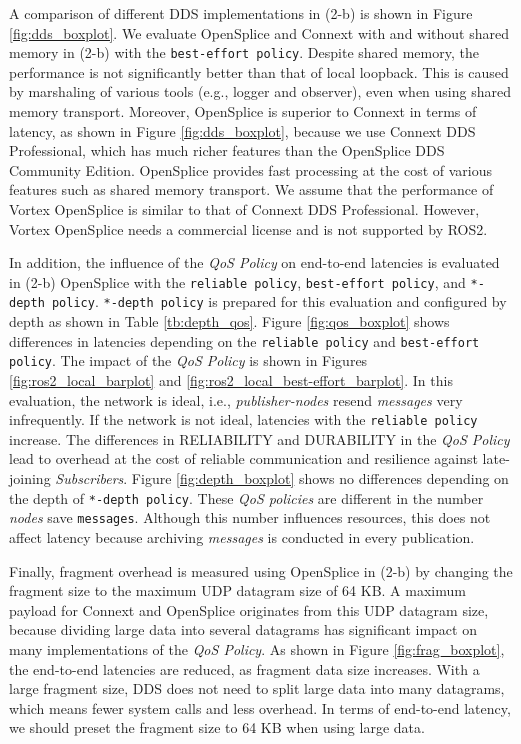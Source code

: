 \documentclass{sig-alternate-05-2015}
\begin{document}
A comparison of different DDS implementations in (2-b) is shown in Figure \ref{fig:dds_boxplot}.
We evaluate OpenSplice and Connext with and without shared memory in (2-b) with the \texttt{best-effort policy}.
Despite shared memory, the performance is not significantly better than that of local loopback. 
This is caused by marshaling of various tools (e.g., logger and observer), even when using shared memory transport.
Moreover, OpenSplice is superior to Connext in terms of latency, as shown in Figure \ref{fig:dds_boxplot}, because we use Connext DDS Professional, which has much richer features than the OpenSplice DDS Community Edition.
OpenSplice provides fast processing at the cost of various features such as shared memory transport.
We assume that the performance of Vortex OpenSplice is similar to that of Connext DDS Professional.
However, Vortex OpenSplice needs a commercial license and is not supported by ROS2.

In addition, the influence of the \emph{QoS Policy} on end-to-end latencies is evaluated in (2-b) OpenSplice with the \texttt{reliable policy}, \texttt{best-effort policy}, and \texttt{*-depth policy}.
\texttt{*-depth policy} is prepared for this evaluation and configured by depth as shown in Table \ref{tb:depth_qos}.
Figure \ref{fig:qos_boxplot} shows differences in latencies depending on the \texttt{reliable policy} and \texttt{best-effort policy}.
The impact of the \emph{QoS Policy} is shown in Figures \ref{fig:ros2_local_barplot} and \ref{fig:ros2_local_best-effort_barplot}.
In this evaluation, the network is ideal, i.e., \emph{publisher-nodes} resend \emph{messages} very infrequently.
If the network is not ideal, latencies with the \texttt{reliable policy} increase.
The differences in RELIABILITY and DURABILITY in the \emph{QoS Policy} lead to overhead at the cost of reliable communication and resilience against late-joining \emph{Subscribers}.
Figure \ref{fig:depth_boxplot} shows no differences depending on the depth of \texttt{*-depth policy}.
These \emph{QoS policies} are different in the number \emph{nodes} save \texttt{messages}.
Although this number influences resources, this does not affect latency because archiving \emph{messages} is conducted in every publication.

Finally, fragment overhead is measured using OpenSplice in (2-b) by changing the fragment size to the maximum UDP datagram size of 64 KB. 
A maximum payload for Connext and OpenSplice originates from this UDP datagram size, because dividing large data into several datagrams has significant impact on many implementations of the \emph{QoS Policy}.
As shown in Figure \ref{fig:frag_boxplot}, the end-to-end latencies are reduced, as fragment data size increases.
With a large fragment size, DDS does not need to split large data into many datagrams, which means fewer system calls and less overhead.
In terms of end-to-end latency, we should preset the fragment size to 64 KB when using large data.
\end{document}
